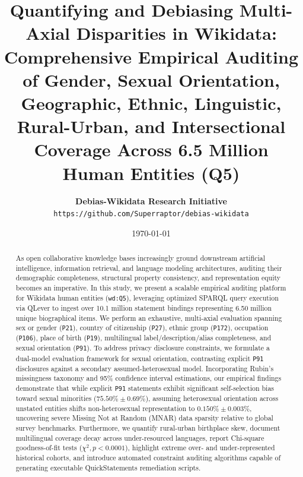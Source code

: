 \documentclass[11pt,a4paper]{article}
\title{\textbf{Quantifying and Debiasing Multi-Axial Disparities in Wikidata:}\\
\large Comprehensive Empirical Auditing of Gender, Sexual Orientation, Geographic, Ethnic, Linguistic, Rural-Urban, and Intersectional Coverage Across 6.5 Million Human Entities (Q5)}
\author{
  \textbf{Debias-Wikidata Research Initiative}\\
  \texttt{https://github.com/Superraptor/debias-wikidata}
}
\date{\today}
\begin{document}
\maketitle

\begin{abstract}
As open collaborative knowledge bases increasingly ground downstream artificial intelligence, information retrieval, and language modeling architectures, auditing their demographic completeness, structural property consistency, and representation equity becomes an imperative. In this study, we present a scalable empirical auditing platform for Wikidata human entities (\texttt{wd:Q5}), leveraging optimized SPARQL query execution via QLever to ingest over 10.1 million statement bindings representing 6.50 million unique biographical items. We perform an exhaustive, multi-axial evaluation spanning sex or gender (\texttt{P21}), country of citizenship (\texttt{P27}), ethnic group (\texttt{P172}), occupation (\texttt{P106}), place of birth (\texttt{P19}), multilingual label/description/alias completeness, and sexual orientation (\texttt{P91}). To address privacy disclosure constraints, we formulate a dual-model evaluation framework for sexual orientation, contrasting explicit \texttt{P91} disclosures against a secondary assumed-heterosexual model. Incorporating Rubin's missingness taxonomy and 95\% confidence interval estimations, our empirical findings demonstrate that while explicit \texttt{P91} statements exhibit significant self-selection bias toward sexual minorities ($75.50\% \pm 0.69\%$), assuming heterosexual orientation across unstated entities shifts non-heterosexual representation to $0.150\% \pm 0.003\%$, uncovering severe Missing Not at Random (MNAR) data sparsity relative to global survey benchmarks. Furthermore, we quantify rural-urban birthplace skew, document multilingual coverage decay across under-resourced languages, report Chi-square goodness-of-fit tests ($\chi^2, p < 0.0001$), highlight extreme over- and under-represented historical cohorts, and introduce automated constraint auditing algorithms capable of generating executable QuickStatements remediation scripts.
\end{abstract}
\end{document}
